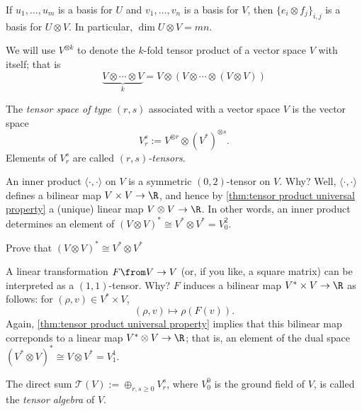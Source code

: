 \begin{proposition}\label{prop:tensor basis}
	If $u_1, \dots , u_m$ is a basis for $U$ and $v_1, \dots , v_n$ is a basis for $V$, then $\{e_i \otimes f_j\}_{i,j}$ is a basis for $U \otimes V$. In particular, $\dim U \otimes V = mn$.
\end{proposition}

\begin{notation}
	We will use $V^{\otimes k}$ to denote the $k$-fold tensor product of a vector space $V$ with itself; that is
	\[
		\underbrace{V \otimes \cdots \otimes V}_k = V \otimes (V \otimes \cdots \otimes (V \otimes V))
	\]
\end{notation}

\begin{definition}\label{def:tensor space}
	The \emph{tensor space of type $(r,s)$} associated with a vector space $V$ is the vector space
	\[
		V_r^s := V^{\otimes r} \otimes (V^\ast)^{\otimes s}.
	\]
	Elements of $V_r^s$ are called \emph{$(r,s)$-tensors}.
\end{definition}

\begin{example}
	An inner product $\langle \cdot , \cdot \rangle$ on $V$ is a symmetric $(0,2)$-tensor on $V$. Why? Well, $\langle \cdot , \cdot \rangle$ defines a bilinear map $V \times V \to \R$, and hence by \cref{thm:tensor product universal property} a (unique) linear map $V \otimes V \to \R$. In other words, an inner product determines an element of $(V \otimes V)^\ast \cong V^\ast \otimes V^\ast = V_0^2$.
	\begin{exercise}
		Prove that $(V \otimes V)^\ast \cong V^\ast \otimes V^\ast$
	\end{exercise}
\end{example}

\begin{example}
	A linear transformation $F\from V \to V$ (or, if you like, a square matrix) can be interpreted as a $(1,1)$-tensor. Why? $F$ induces a bilinear map $V^\ast \times V \to \R$ as follows: for $(\rho,v) \in V^\ast \times V$,
	\[
		(\rho, v ) \mapsto \rho(F(v)).
	\]
	Again, \cref{thm:tensor product universal property} implies that this bilinear map correponds to a linear map $V^\ast \otimes V \to \R$; that is, an element of the dual space $(V^\ast \otimes V)^\ast \cong V \otimes V^\ast = V_1^1$.
\end{example}

\begin{definition}\label{def:tensor algebra}
	The direct sum $\mathcal{T}(V):= \oplus_{r,s \geq 0} V_r^s$, where $V_0^0$ is the ground field of $V$, is called the \emph{tensor algebra} of $V$.
\end{definition}

